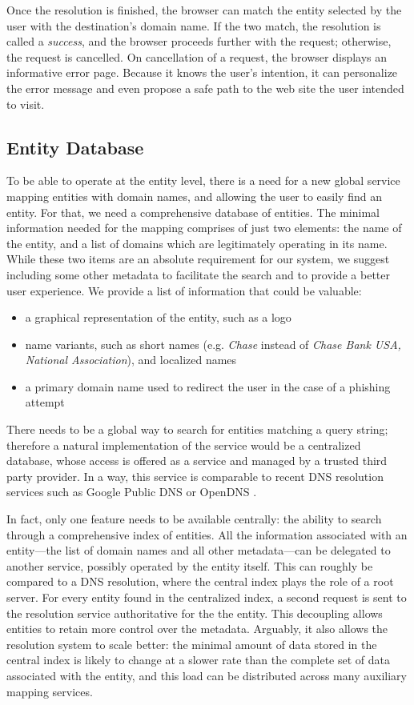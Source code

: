 \documentclass[11pt,styles/chicago,a4paper]{article}
\begin{document}
Once the resolution is finished, the browser can match the entity selected by the user with the destination's domain name. If the two match, the resolution is called a \emph{success}, and the browser proceeds further with the request; otherwise, the request is cancelled. On cancellation of a request, the browser displays an informative error page. Because it knows the user's intention, it can personalize the error message and even propose a safe path to the web site the user intended to visit.

\subsection{Entity Database}

To be able to operate at the entity level, there is a need for a new global service mapping entities with domain names, and allowing the user to easily find an entity. For that, we need a comprehensive database of entities. The minimal information needed for the mapping comprises of just two elements: the name of the entity, and a list of domains which are legitimately operating in its name. While these two items are an absolute requirement for our system, we suggest including some other metadata to facilitate the search and to provide a better user experience. We provide a list of information that could be valuable:

\begin{itemize}
\item a graphical representation of the entity, such as a logo
\item name variants, such as short names (e.g. \emph{Chase} instead of \emph{Chase Bank USA, National Association}), and localized names
\item a primary domain name used to redirect the user in the case of a phishing attempt
\end{itemize}

There needs to be a global way to search for entities matching a query string; therefore a natural implementation of the service would be a centralized database, whose access is offered as a service and managed by a trusted third party provider. In a way, this service is comparable to recent DNS resolution services such as Google Public DNS \cite{googledns} or OpenDNS \cite{opendns}.

In fact, only one feature needs to be available centrally: the ability to search through a comprehensive index of entities. All the information associated with an entity---the list of domain names and all other metadata---can be delegated to another service, possibly operated by the entity itself. This can roughly be compared to a DNS resolution, where the central index plays the role of a root server. For every entity found in the centralized index, a second request is sent to the resolution service authoritative for the the entity. This decoupling allows entities to retain more control over the metadata. Arguably, it also allows the resolution system to scale better: the minimal amount of data stored in the central index is likely to change at a slower rate than the complete set of data associated with the entity, and this load can be distributed across many auxiliary mapping services.
\end{document}
